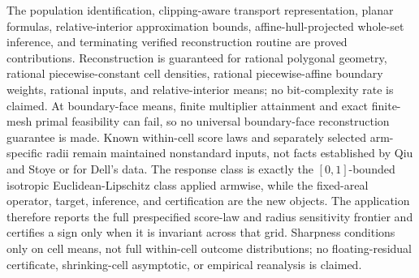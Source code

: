 \documentclass{article}
\begin{document}
The population identification, clipping-aware transport representation, planar formulas, relative-interior approximation bounds, affine-hull-projected whole-set inference, and terminating verified reconstruction routine are proved contributions. Reconstruction is guaranteed for rational polygonal geometry, rational piecewise-constant cell densities, rational piecewise-affine boundary weights, rational inputs, and relative-interior means; no bit-complexity rate is claimed. At boundary-face means, finite multiplier attainment and exact finite-mesh primal feasibility can fail, so no universal boundary-face reconstruction guarantee is made. Known within-cell score laws and separately selected arm-specific radii remain maintained nonstandard inputs, not facts established by Qiu and Stoye or for Dell's data. The response class is exactly the \([0,1]\)-bounded isotropic Euclidean-Lipschitz class applied armwise, while the fixed-areal operator, target, inference, and certification are the new objects. The application therefore reports the full prespecified score-law and radius sensitivity frontier and certifies a sign only when it is invariant across that grid. Sharpness conditions only on cell means, not full within-cell outcome distributions; no floating-residual certificate, shrinking-cell asymptotic, or empirical reanalysis is claimed.
\end{document}
